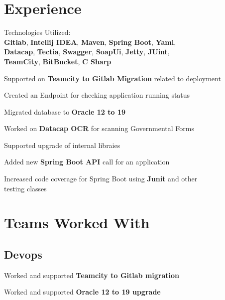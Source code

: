 \documentclass[]{deedy-resume-openfont}
\begin{document}
\begin{minipage}[t]{0.66\textwidth} 


\section{Experience}

\sectionsep
\begin{tightemize}
\item Technologies Utilized: 
\\\textbf{Gitlab}, \textbf{Intellij IDEA}, \textbf{Maven}, \textbf{Spring Boot}, \textbf{Yaml}, \\ \textbf{Datacap}, \textbf{Tectia}, \textbf{Swagger}, \textbf{SoapUi},
\textbf{Jetty}, \textbf{JUint}, \\ 
\textbf{TeamCity}, \textbf{BitBucket}, \textbf{C Sharp}

\item Supported on \textbf{Teamcity to Gitlab Migration} related to deployment
\item Created an Endpoint for checking application running status
\item Migrated database to \textbf{Oracle 12 to 19}
\item Worked on \textbf{Datacap OCR} for scanning Governmental Forms 
\item Supported upgrade of internal libraies  
\item Added new \textbf{Spring Boot API} call for an application
\item Increased code coverage for Spring Boot using \textbf{Junit} and other \\testing classes
\end{tightemize}



\section{Teams Worked With} 

\subsection{Devops}
\sectionsep
\begin{tightemize}
\item Worked and supported \textbf{Teamcity to Gitlab migration}
\item Worked and supported \textbf{Oracle 12 to 19 upgrade}
\end{tightemize}
\sectionsep


\end{minipage}
\end{document}
